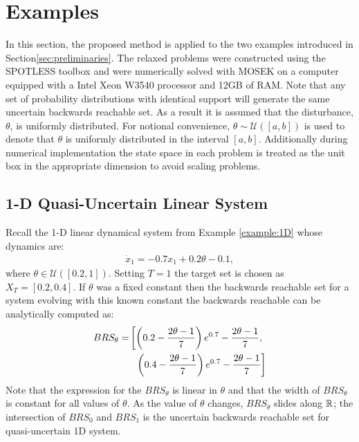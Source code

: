 \section{Examples}
\label{sec:examples}
In this section, the proposed method is applied to the two examples introduced in Section\ref{sec:preliminaries}. 
The relaxed problems were constructed using the SPOTLESS toolbox \cite{spotless} and were numerically solved with MOSEK on a computer equipped with a Intel Xeon W3540 processor and 12GB of RAM.
Note that any set of probability distributions with identical support will generate the same uncertain backwards reachable set.
As a result it is assumed that the disturbance, $\theta$, is uniformly distributed. 
For notional convenience, $\theta\sim\mathcal U([a,b])$ is used to denote that $\theta$ is uniformly distributed in the interval $[a,b]$.
Additionally during numerical implementation the state space in each problem is treated as the unit box in the appropriate dimension to avoid scaling problems.

\subsection{1-D Quasi-Uncertain Linear System}
Recall the 1-D linear dynamical system from Example \ref{example:1D} whose dynamics are:
  \begin{align}
	\dot x_1 = -0.7x_1+0.2\theta-0.1,
\end{align}
where $\theta\in \mathcal U([0.2,1])$.
Setting $T = 1$ the target set is chosen as $X_T=[0.2,0.4]$.
If $\theta$ was a fixed constant then the backwards reachable set for a system evolving with this known constant the backwards reachable can be analytically computed as:
\begin{align}
	\begin{aligned}
  		BRS_\theta=&\left[\left(0.2-\frac{2\theta-1}{7}\right)e^{0.7}-\frac{2\theta-1}{7}, \right. \\
					&\hspace*{0.2cm}\left.\left(0.4-\frac{2\theta-1}{7}\right)e^{0.7}-\frac{2\theta-1}{7}\right]
	\end{aligned}
\end{align}
\normalsize
Note that the expression for the $BRS_\theta$ is linear in $\theta$ and that the width of $BRS_\theta$ is constant for all values of $\theta$. 
As the value of $\theta$ changes, $BRS_\theta$ slides along $\mathbb{R}$; the intersection of $BRS_0$ and $BRS_1$ is the uncertain backwards reachable set for quasi-uncertain 1D system.

